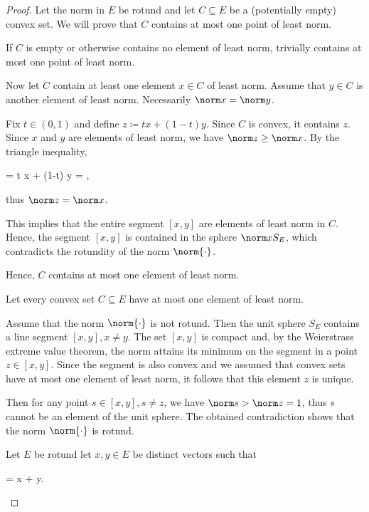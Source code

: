 \begin{proof}
   Let the norm in \( E \) be rotund and let \( C \subseteq E \) be a (potentially empty) convex set. We will prove that \( C \) contains at most one point of least norm.

  If \( C \) is empty or otherwise contains no element of least norm, trivially contains at most one point of least norm.

  Now let \( C \) contain at least one element \( x \in C \) of least norm. Assume that \( y \in C \) is another element of least norm. Necessarily \( \norm x = \norm y \).

  Fix \( t \in (0, 1) \) and define \( z \coloneqq tx + (1-t)y \). Since \( C \) is convex, it contains \( z \). Since \( x \) and \( y \) are elements of least norm, we have \( \norm z \geq \norm x \). By the triangle inequality,
  \begin{balign*}
    =
    \leq
    t \norm x + (1-t) \norm y
    =
    ,
  \end{balign*}
  thus \( \norm z = \norm x \).

  This implies that the entire segment \( [x, y] \) are elements of least norm in \( C \). Hence, the segment \( [x, y] \) is contained in the sphere \( \norm x S_E \), which contradicts the rotundity of the norm \( \norm{\cdot} \).

  Hence, \( C \) contains at most one element of least norm.

   Let every convex set \( C \subseteq E \) have at most one element of least norm.

  Assume that the norm \( \norm{\cdot} \) is not rotund. Then the unit sphere \( S_E \) contains a line segment \( [x, y], x \neq y \). The set \( [x, y] \) is compact and, by the Weierstrass extreme value theorem, the norm attains its minimum on the segment in a point \( z \in [x, y] \). Since the segment is also convex and we assumed that convex sets have at most one element of least norm, it follows that this element \( z \) is unique.

  Then for any point \( s \in [x, y], s \neq z \), we have \( \norm s > \norm z = 1 \), thus \( s \) cannot be an element of the unit sphere. The obtained contradiction shows that the norm \( \norm{\cdot} \) is rotund.

   Let \( E \) be rotund let \( x, y \in E \) be distinct vectors such that
  \begin{balign}\label{def:rotund_norm/linearly_dependent/assumption}
     = \norm x + \norm y.
  \end{balign}


\end{proof}
